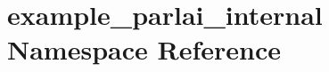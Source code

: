 \hypertarget{namespaceexample__parlai__internal}{}\section{example\+\_\+parlai\+\_\+internal Namespace Reference}
\label{namespaceexample__parlai__internal}
